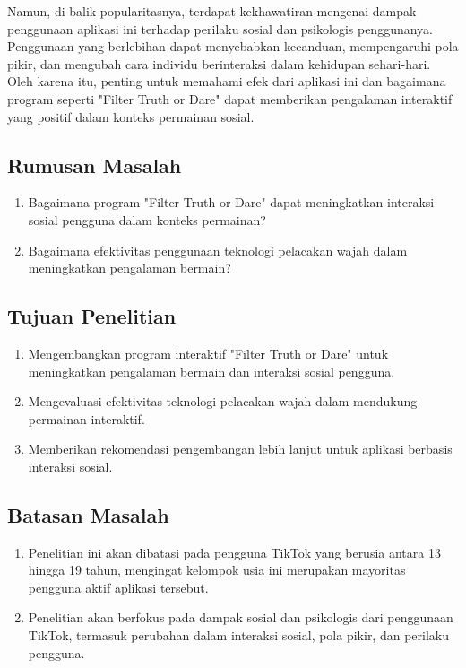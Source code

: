 \documentclass[11pt,a4paper]{article}
\begin{document}
Namun, di balik popularitasnya, terdapat kekhawatiran mengenai dampak penggunaan aplikasi ini terhadap perilaku sosial dan psikologis penggunanya. Penggunaan yang berlebihan dapat menyebabkan kecanduan, mempengaruhi pola pikir, dan mengubah cara individu berinteraksi dalam kehidupan sehari-hari. Oleh karena itu, penting untuk memahami efek dari aplikasi ini dan bagaimana program seperti "Filter Truth or Dare" dapat memberikan pengalaman interaktif yang positif dalam konteks permainan sosial.


\subsection{Rumusan Masalah}
\begin{enumerate}
    \item Bagaimana program "Filter Truth or Dare" dapat meningkatkan interaksi sosial pengguna dalam konteks permainan?
    \item Bagaimana efektivitas penggunaan teknologi pelacakan wajah dalam meningkatkan pengalaman bermain?
\end{enumerate}

\subsection{Tujuan Penelitian}
\begin{enumerate}
    \item Mengembangkan program interaktif "Filter Truth or Dare" untuk meningkatkan pengalaman bermain dan interaksi sosial pengguna.
    \item Mengevaluasi efektivitas teknologi pelacakan wajah dalam mendukung permainan interaktif.
    \item Memberikan rekomendasi pengembangan lebih lanjut untuk aplikasi berbasis interaksi sosial.
\end{enumerate}

\subsection{Batasan Masalah}
\begin{enumerate}
    \item Penelitian ini akan dibatasi pada pengguna TikTok yang berusia antara 13 hingga 19 tahun, mengingat kelompok usia ini merupakan mayoritas pengguna aktif aplikasi tersebut.
    \item Penelitian akan berfokus pada dampak sosial dan psikologis dari penggunaan TikTok, termasuk perubahan dalam interaksi sosial, pola pikir, dan perilaku pengguna.
\end{enumerate}
\end{document}
